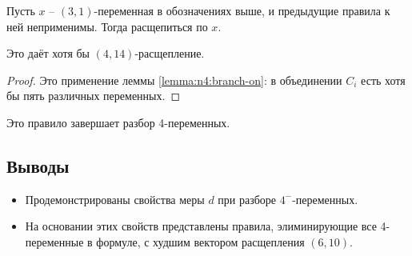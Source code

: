 \begin{brule}
 Пусть $x$ -- $(3,1)$-переменная в обозначениях выше, и предыдущие правила к ней неприменимы.
 Тогда расщепиться по $x$.

 Это даёт хотя бы $(4,14)$-расщепление.
\end{brule}

\begin{proof}
 Это применение леммы \ref{lemma:n4:branch-on}: в объединении $C_i$ есть хотя бы пять различных переменных.
\end{proof}

Это правило завершает разбор 4-переменных.

\subsection{Выводы}
\label{subsec:n4:summary}

\begin{itemize}
 \item Продемонстрированы свойства меры $d$ при разборе $4^-$-переменных.
 \item На основании этих свойств представлены правила, элиминирующие все 4-переменные в формуле, с худшим вектором расщепления $(6,10)$.
\end{itemize}

